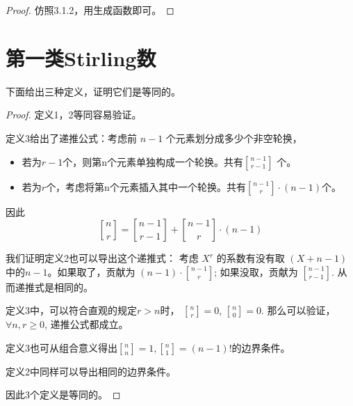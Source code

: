 \documentclass[oneside]{book}
\begin{document}

\begin{proof}
    仿照3.1.2，用生成函数即可。
\end{proof}

\section{第一类Stirling数}

下面给出三种定义，证明它们是等同的。



\begin{proof}
    定义1，2等同容易验证。
    
    定义3给出了递推公式：考虑前 $n-1$ 个元素划分成多少个非空轮换，
    \begin{itemize}
        \item 若为$r-1$个，则第n个元素单独构成一个轮换。共有$n-1\brack {r-1}$ 个。
        \item 若为$r$个，考虑将第n个元素插入其中一个轮换。共有${n-1\brack r} \cdot (n-1)$个。
    \end{itemize}
    因此 \[{n\brack r} = {n-1\brack r-1} + {n-1\brack r}\cdot (n-1)\]

    我们证明定义2也可以导出这个递推式：
    考虑 $X^r$ 的系数有没有取 $(X+n-1)$中的$n-1$。如果取了，贡献为 $(n-1)\cdot {n-1\brack r}$; 如果没取，贡献为 $n-1\brack r-1$. 从而递推式是相同的。

    定义3中，可以符合直观的规定$r>n$时， ${n\brack r} = 0$, ${n\brack 0} = 0$. 那么可以验证，$\forall n,r \ge 0$, 递推公式都成立。 
    
    定义3也可从组合意义得出${n\brack n}= 1, {n\brack 1} = (n-1)!$的边界条件。
    
    定义2中同样可以导出相同的边界条件。

    因此3个定义是等同的。
\end{proof}
\end{document}
